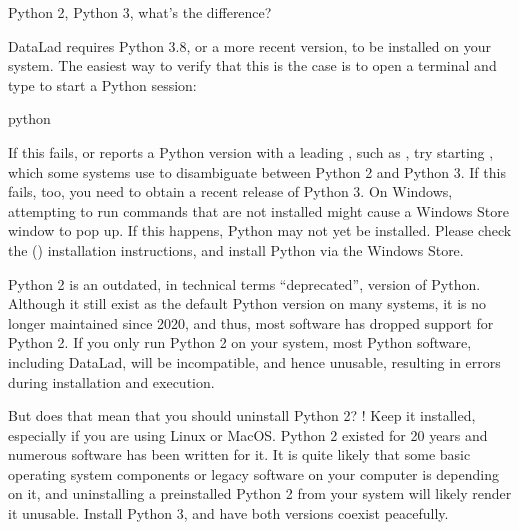 \ignorespaces \begin{findoutmore}[label={fom-py2v3}, before title={\thetcbcounter\ }, float, floatplacement=tb, check odd page=true]{Python 2, Python 3, what’s the difference?}
\label{\detokenize{intro/installation:fom-py2v3}}

\sphinxAtStartPar
DataLad requires Python 3.8, or a more recent version, to be installed on your system.
The easiest way to verify that this is the case is to open a terminal and type  to start a Python session:

\begin{sphinxVerbatim}[commandchars=\\\{\}]
python
\end{sphinxVerbatim}

\sphinxAtStartPar
If this fails, or reports a Python version with a leading , such as , try starting , which some systems use to disambiguate between Python 2 and Python 3.
If this fails, too, you need to obtain a recent release of Python 3. On Windows, attempting to run commands that are not installed might cause a Windows Store window to pop up.
If this happens, Python may not yet be installed. Please check the {\hyperref[\detokenize{intro/installation:windows-10-and-11}]{}} () installation instructions, and  install Python via the Windows Store.

\sphinxAtStartPar
Python 2 is an outdated, in technical terms “deprecated”, version of Python.
Although it still exist as the default Python version on many systems, it is no longer maintained since 2020, and thus, most software has dropped support for Python 2.
If you only run Python 2 on your system, most Python software, including DataLad, will be incompatible, and hence unusable,  resulting in errors during installation and execution.

\sphinxAtStartPar
But does that mean that you should uninstall Python 2?  !  Keep it installed, especially if you are using Linux or MacOS.
Python 2 existed for 20 years and numerous software has been written for it.
It is quite likely that some basic operating system components or legacy software on your computer is depending on it, and uninstalling a preinstalled Python 2 from your system will likely render it unusable.
Install Python 3, and have both versions coexist peacefully.


\end{findoutmore}

